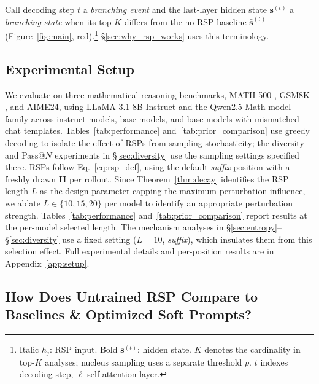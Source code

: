 Call decoding step $t$ a \emph{branching event} and the last-layer hidden state $\mathbf{s}^{(t)}$ a \emph{branching state} when its top-$K$ differs from the no-RSP baseline $\bar{\mathbf{s}}^{(t)}$ (Figure~\ref{fig:main}, red).\footnote{Italic $h_j$: RSP input. Bold $\mathbf{s}^{(t)}$: hidden state. $K$ denotes the cardinality in top-$K$ analyses; nucleus sampling uses a separate threshold $p$. $t$ indexes decoding step, $\ell$ self-attention layer.} \S\ref{sec:why_rsp_works} uses this terminology.

\subsection{Experimental Setup}\label{sec:setup}

We evaluate on three mathematical reasoning benchmarks, MATH-500 \citep{lightman2024lets}, GSM8K \citep{cobbe2021training}, and AIME24, using LLaMA-3.1-8B-Instruct \citep{grattafiori2024llama} and the Qwen2.5-Math model family \citep{yang2024qwen25math} across instruct models, base models, and base models with mismatched chat templates. Tables~\ref{tab:performance} and~\ref{tab:prior_comparison} use greedy decoding to isolate the effect of RSPs from sampling stochasticity; the diversity and Pass@$N$ experiments in \S\ref{sec:diversity} use the sampling settings specified there. RSPs follow Eq.~\eqref{eq:rsp_def}, using the default \emph{suffix} position with a freshly drawn $\mathbf{H}$ per rollout. Since Theorem~\ref{thm:decay} identifies the RSP length $L$ as the design parameter capping the maximum perturbation influence, we ablate $L \in \{10,15,20\}$ per model to identify an appropriate perturbation strength. Tables~\ref{tab:performance} and~\ref{tab:prior_comparison} report results at the per-model selected length. The mechanism analyses in \S\ref{sec:entropy}--\S\ref{sec:diversity} use a fixed setting ($L{=}10$, \emph{suffix}), which insulates them from this selection effect. Full experimental details and per-position results are in Appendix~\ref{app:setup}.

\subsection{How Does Untrained RSP Compare to Baselines \& Optimized Soft Prompts?}\label{sec:performance}

